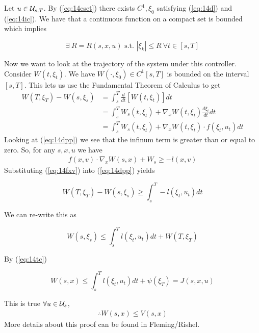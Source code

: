Let $u\in\mathcal{U}_{s,T}$.
By (\ref{eq:14cset}) there exists $C^1, \xi_0$ satisfying (\ref{eq:14d}) and (\ref{eq:14ic}).
We have that a continuous function on a compact set is bounded which implies

\begin{equation*}
\exists~R=R(s,x,u) \text{~s.t.~} |\xi_k|\leq R~\forall t\in[s,T]
\end{equation*}

Now we want to look at the trajectory of the system under this controller.
Consider $W(t,\xi_t)$.
We have $W(\cdot,\xi_0)\in C^1[s,T]$ is bounded on the interval $[s,T]$.
This lets us use the Fundamental Theorem of Calculus to get
\begin{align*}
W(T,\xi_T) - W(s,\xi_s) &= \int_s^T \frac{d}{dt}[W(t,\xi_t)]dt \\
&= \int_s^T W_s(t,\xi_t) + \nabla_x W(t,\xi_t) \frac{d\xi_t}{dt}dt \\
&= \int_s^T W_s(t,\xi_t) + \nabla_x W(t,\xi_t)\cdot f(\xi_t,u_t)dt
\end{align*}
Looking at (\ref{eq:14dpp}) we see that the infinum term is greater than or equal to zero.
So, for any $s,x,u$ we have
\begin{align}
\label{eq:14fxv}
f(x,v)\cdot\nabla_x W(s,x)+W_s \geq -l(x,v)
\end{align}
Substituting (\ref{eq:14fxv}) into (\ref{eq:14dpp}) yields

\begin{equation*}
W(T,\xi_T) - W(s,\xi_s) \geq \int_s^T -l(\xi_t,u_t)dt
\end{equation*}

We can re-write this as

\begin{equation*}
W(s,\xi_s) \leq \int_s^T l(\xi_t,u_t)dt + W(T,\xi_T)
\end{equation*}

By (\ref{eq:14tc})

\begin{equation*}
W(s,x) \leq \int_s^T l(\xi_t,u_t)dt + \psi(\xi_T) = J(s,x,u)
\end{equation*}

This is true $\forall u\in\mathcal{U}_s$,
\begin{align}
\label{eq:14wv}
\therefore W(s,x) \leq V(s,x)
\end{align}
More details about this proof can be found in Fleming/Rishel.

